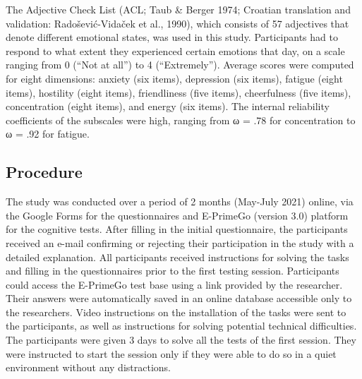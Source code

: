 \documentclass[authordate, empirical,issue]{jote-new-article}
\begin{document}
The Adjective Check List (ACL; Taub \& Berger 1974; Croatian translation and validation: Radošević-Vidaček et al., 1990), which consists of 57 adjectives that denote different emotional states, was used in this study. Participants had to respond to what extent they experienced certain emotions that day, on a scale ranging from 0 (“Not at all”) to 4 (“Extremely”). Average scores were computed for eight dimensions: anxiety (six items), depression (six items), fatigue (eight items), hostility (eight items), friendliness (five items), cheerfulness (five items), concentration (eight items), and energy (six items). The internal reliability coefficients of the subscales were high, ranging from ω = .78 for concentration to ω = .92 for fatigue.



\subsection{Procedure }



The study was conducted over a period of 2 months (May-July 2021) online, via the Google Forms for the questionnaires and E-PrimeGo (version 3.0) platform for the cognitive tests. After filling in the initial questionnaire, the participants received an e-mail confirming or rejecting their participation in the study with a detailed explanation. All participants received instructions for solving the tasks and filling in the questionnaires prior to the first testing session. Participants could access the E-PrimeGo test base using a link provided by the researcher. Their answers were automatically saved in an online database accessible only to the researchers. Video instructions on the installation of the tasks were sent to the participants, as well as instructions for solving potential technical difficulties. The participants were given 3 days to solve all the tests of the first session. They were instructed to start the session only if they were able to do so in a quiet environment without any distractions.
\end{document}
